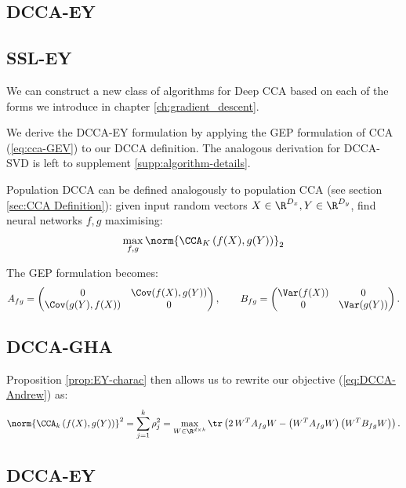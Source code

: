 \subsection{DCCA-EY}

\subsection{SSL-EY}

We can construct a new class of algorithms for Deep CCA based on each of the forms we introduce in chapter \ref{ch:gradient_descent}.

We derive the DCCA-EY formulation by applying the GEP formulation of CCA (\ref{eq:cca-GEV}) to our DCCA definition. The analogous derivation for DCCA-SVD is left to supplement \ref{supp:algorithm-details}. 

Population DCCA \cite{andrew2013deep} can be defined analogously to population CCA (see section \ref{sec:CCA Definition}):
given input random vectors $X \in \R^{D_x}, Y \in \R^{D_y}$, find neural networks $f,g$ maximising:
\begin{align}\label{eq:DCCA-Andrew}
    \max_{f,g}  \norm{\CCA_K\left(f(X),g(Y)\right)}_2
\end{align}

The GEP formulation becomes:
\begin{equation*}
    A_{fg} = \begin{pmatrix} 0 &\Cov(f(X),g(Y)) \\ \Cov(g(Y),f(X)) & 0 \end{pmatrix}, \qquad
	B_{fg} = \begin{pmatrix}\Var(f(X)) & 0 \\ 0 & \Var(g(Y)) \end{pmatrix}.
\end{equation*}

\subsection{DCCA-GHA}

Proposition \ref{prop:EY-charac} then allows us to rewrite our objective (\ref{eq:DCCA-Andrew}) as:
\begin{align*}
    \norm{\CCA_k\left(f(X),g(Y)\right)}^2 
    = \sum_{j=1}^k \rho_j^2 
    = \max_{W \in \R^{d \times k}} \tr \left( 2\, W^T A_{fg} W - \left(W^T A_{fg} W\right) \left(W^T B_{fg} W\right) \right).
\end{align*}

\subsection{DCCA-EY}

